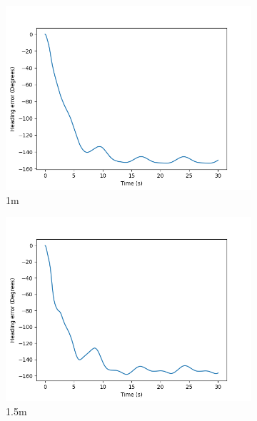 \documentclass[class=article, crop=false]{standalone}
\begin{document}
\begin{figure}
\begin{subfigure}[b]{0.48\textwidth}
        \label{}
    \end{subfigure}
    \vfill
    \begin{subfigure}[b]{0.48\textwidth}
        \centering
        \includegraphics{scenario1/rov-0m/1.0m/usv_heading_error_uncontrolled}
        \caption{1m}
        \label{}
    \end{subfigure}
    \hfill
    \begin{subfigure}[b]{0.48\textwidth}
        \centering
        \includegraphics{scenario1/rov-0m/1.5m/usv_heading_error_uncontrolled}
        \caption{1.5m}
        \label{}
    \end{subfigure}
    \vfill
    \begin{subfigure}[b]{0.48\textwidth}

\end{subfigure}
\end{figure}
\end{document}
